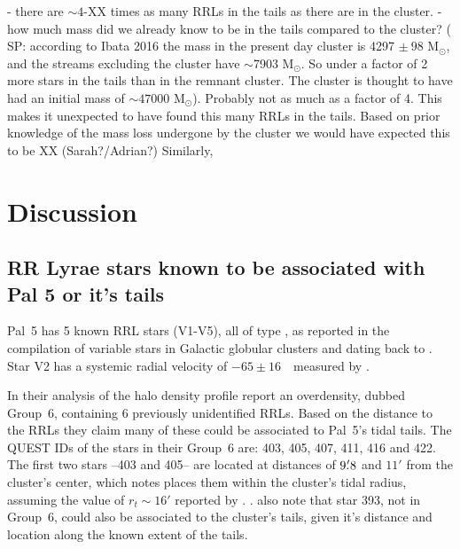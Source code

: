 \documentclass[twocolumn]{aastex63}
\newcommand{\sa}[1]{{\color{teal} SP: #1}}
\begin{document}


- there are $\sim4$-XX times as many RRLs in the tails as there are in the cluster.
- how much mass did we already know to be in the tails compared to the cluster? (\sa{according to Ibata 2016 the mass in the present day cluster is 4297 $\pm~ 98$ M$_{\odot}$, and the streams excluding the cluster have $\sim$7903 M$_{\odot}$. So under a factor of 2 more stars in the tails than in the remnant cluster}. The cluster is thought to have had an initial mass of $\sim47000$ M$_{\odot}$). Probably not as much as a factor of 4. This makes it unexpected to have found this many RRLs in the tails. Based on prior knowledge of the mass loss undergone by the cluster we would have expected this to be XX (Sarah?/Adrian?) Similarly,


\section{Discussion}

\subsection{RR Lyrae stars known to be associated with Pal 5 or it's tails}


Pal~5 has 5 known RRL stars (V1-V5), all of type \typec, as reported in the \citet{Clement2001} compilation of variable stars in Galactic globular clusters and dating back to \citet{SawyerHogg1973}. Star V2 has a  systemic radial velocity of  $-65\pm16$~\kms~measured by \citet{Vivas2005}.

In their analysis of the halo density profile \citet{Vivas2006} report an overdensity, dubbed Group~6, containing 6 previously unidentified RRLs. Based on the distance to the RRLs they claim many of these could be associated to Pal~5's tidal tails. The QUEST IDs of the stars in their Group~6 are: 403, 405, 407, 411, 416 and 422. The first two stars --403 and 405-- are located at distances of  $9\mbox{$.\mkern-4mu^\prime$}8$ and $11'$ from the cluster's center, which \citet{Vivas2004} notes places them within the cluster's tidal radius, assuming the value of $r_t\sim16'$ reported by \citet{Odenkirchen:2002}.  . \citet{Vivas2006} also note that star 393, not in Group~6, could also be associated to the cluster's tails, given it's distance and location along the known extent of the tails.
\end{document}
